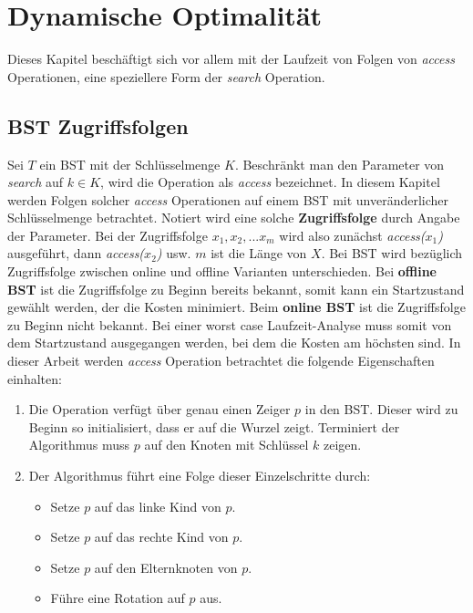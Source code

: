 \documentclass[a4paper,12pt]{article}
\begin{document}
\newpage
\section{Dynamische Optimalität}
Dieses Kapitel beschäftigt sich vor allem mit der Laufzeit von Folgen von \textit{access} Operationen, eine speziellere Form der \textit{search} Operation.  
\subsection{BST Zugriffsfolgen}
Sei $T$ ein BST mit der Schlüsselmenge $K$. Beschränkt man den Parameter von \textit{search} auf $k \in K $, wird  die Operation als \textit{access} bezeichnet. In diesem Kapitel werden Folgen solcher \textit{access} Operationen auf einem BST mit unveränderlicher Schlüsselmenge betrachtet. Notiert wird eine solche \textbf{Zugriffsfolge} durch Angabe der Parameter. Bei der Zugriffsfolge $x_1,x_2,...x_m$ wird also zunächst \textit{access($x_1$)} ausgeführt, dann \textit{access($x_2$)} usw. $m$ ist die Länge von $X$. Bei BST wird bezüglich Zugriffsfolge zwischen online und offline Varianten unterschieden. Bei \textbf{offline BST} ist die Zugriffsfolge zu Beginn bereits bekannt, somit kann ein Startzustand gewählt werden, der die Kosten minimiert. Beim \textbf{online BST} ist die Zugriffsfolge zu Beginn nicht bekannt. Bei einer worst case Laufzeit-Analyse muss somit von dem Startzustand ausgegangen werden, bei dem die Kosten am höchsten sind.
In dieser Arbeit werden \textit{access} Operation betrachtet die folgende Eigenschaften einhalten:

\begin{enumerate} 
	\item Die Operation verfügt über genau einen Zeiger $p$ in den BST. Dieser wird zu Beginn so initialisiert, dass er auf die Wurzel zeigt. Terminiert der Algorithmus muss $p$ auf den Knoten mit Schlüssel $k$ zeigen.
	\item Der Algorithmus führt eine Folge dieser Einzelschritte durch:
	\begin{itemize}
		\item Setze $p$ auf das linke Kind von $p$.
		\item Setze $p$ auf das rechte Kind von $p$.
		\item Setze $p$ auf den Elternknoten von $p$.
		\item Führe eine Rotation auf $p$ aus.
	\end{itemize}  
	
\end{enumerate}
\end{document}
